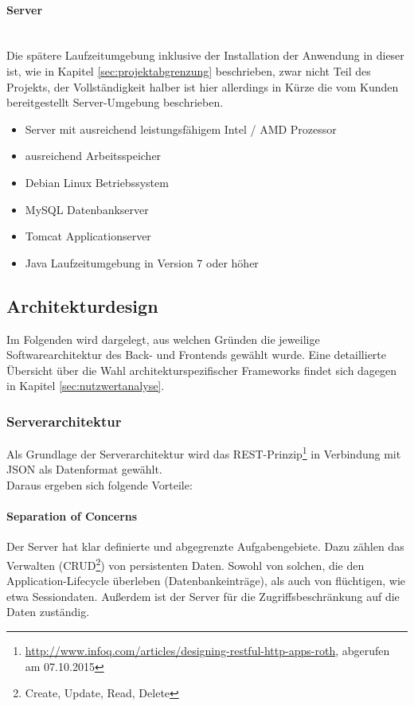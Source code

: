 \documentclass[12pt, xcolor=dvipsnames]{scrartcl}
\begin{document}
\paragraph{Server} ~\\
\label{par:zielplattform_server}%
Die spätere Laufzeitumgebung inklusive der Installation der Anwendung in dieser ist, wie in Kapitel \ref{sec:projektabgrenzung} beschrieben, zwar nicht Teil des Projekts, der Vollständigkeit halber ist hier allerdings in Kürze die vom Kunden bereitgestellt Server-Umgebung beschrieben.
\begin{itemize}
	\item Server mit ausreichend leistungsfähigem Intel / AMD Prozessor
	\item ausreichend Arbeitsspeicher
	\item Debian Linux Betriebssystem
	\item MySQL Datenbankserver
	\item Tomcat Applicationserver	
	\item Java Laufzeitumgebung in Version 7 oder höher
\end{itemize}


\subsection{Architekturdesign}

Im Folgenden wird dargelegt, aus welchen Gründen die jeweilige Softwarearchitektur des Back- und Frontends gewählt wurde. Eine detaillierte Übersicht über die Wahl architekturspezifischer Frameworks findet sich dagegen in Kapitel \ref{sec:nutzwertanalyse}. \\

\subsubsection{Serverarchitektur}

Als Grundlage der Serverarchitektur wird das
REST-Prinzip\footnote{\url{http://www.infoq.com/articles/designing-restful-http-apps-roth}, abgerufen am 07.10.2015} 
in Verbindung mit JSON als Datenformat gewählt. \\

Daraus ergeben sich folgende Vorteile:

\paragraph{Separation of Concerns}
Der Server hat klar definierte und abgegrenzte Aufgabengebiete. Dazu zählen das Verwalten
(CRUD\footnote{Create, Update, Read, Delete}) von persistenten Daten. Sowohl von solchen, die den Application-Lifecycle überleben (Datenbankeinträge), als auch von flüchtigen, wie etwa Sessiondaten. Außerdem ist der Server für die Zugriffsbeschränkung auf die Daten zuständig.
\end{document}
